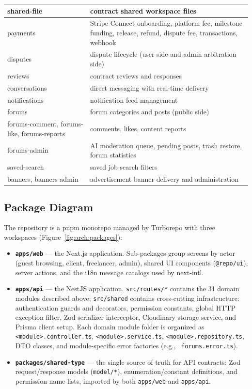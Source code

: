 \begin{longtable}{|L{4.2cm}|L{11.0cm}|}
shared-file & contract shared workspace files \\ \hline
payments & Stripe Connect onboarding, platform fee, milestone funding, release, refund, dispute fee, transactions, webhook \\ \hline
disputes & dispute lifecycle (user side and admin arbitration side) \\ \hline
reviews & contract reviews and responses \\ \hline
conversations & direct messaging with real-time delivery \\ \hline
notifications & notification feed management \\ \hline
forums & forum categories and posts (public side) \\ \hline
forums-comment, forums-like, forums-reports & comments, likes, content reports \\ \hline
forums-admin & AI moderation queue, pending posts, trash restore, forum statistics \\ \hline
saved-search & saved job search filters \\ \hline
banners, banners-admin & advertisement banner delivery and administration \\ \hline
\end{longtable}


\subsection{Package Diagram}

The repository is a pnpm monorepo managed by Turborepo with three workspaces (Figure~\ref{fig:arch:packages}):

\begin{itemize}[leftmargin=*]
    \item \textbf{\texttt{apps/web}} --- the Next.js application. Sub-packages group screens by actor (guest browsing, client, freelancer, admin), shared UI components (\texttt{@repo/ui}), server actions, and the i18n message catalogs used by next-intl.
    \item \textbf{\texttt{apps/api}} --- the NestJS application. \texttt{src/routes/*} contains the 31 domain modules described above; \texttt{src/shared} contains cross-cutting infrastructure: authentication guards and decorators, permission constants, global HTTP exception filter, Zod serializer interceptor, Cloudinary storage service, and Prisma client setup. Each domain module folder is organized as \texttt{<module>.controller.ts}, \texttt{<module>.service.ts}, \texttt{<module>.repository.ts}, DTO classes, and module-specific error factories (e.g., \texttt{ forums.error.ts}).
    \item \textbf{\texttt{packages/shared-type}} --- the single source of truth for API contracts: Zod request/response models (\texttt{model/*}), enumeration/constant definitions, and permission name lists, imported by both \texttt{apps/web} and \texttt{apps/api}.
\end{itemize}

